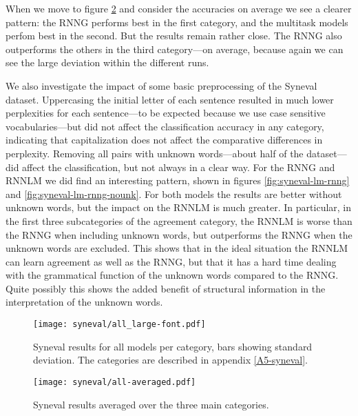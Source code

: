     When we move to figure \ref{fig:syneval-all-averaged} and consider the accuracies on average we see a clearer pattern: the RNNG performs best in the first category, and the multitask models perfom best in the second. But the results remain rather close. The RNNG also outperforms the others in the third category---on average, because again we can see the large deviation within the different runs.

    We also investigate the impact of some basic preprocessing of the Syneval dataset. Uppercasing the initial letter of each sentence resulted in much lower perplexities for each sentence---to be expected because we use case sensitive vocabularies---but did not affect the classification accuracy in any category, indicating that capitalization does not affect the comparative differences in perplexity. Removing all pairs with unknown words---about half of the dataset---did affect the classification, but not always in a clear way. For the RNNG and RNNLM we did find an interesting pattern, shown in figures \ref{fig:syneval-lm-rnng} and \ref{fig:syneval-lm-rnng-nounk}. For both models the results are better without unknown words, but the impact on the RNNLM is much greater. In particular, in the first three subcategories of the agreement category, the RNNLM is worse than the RNNG when including unknown words, but outperforms the RNNG when the unknown words are excluded. This shows that in the ideal situation the RNNLM can learn agreement as well as the RNNG, but that it has a hard time dealing with the grammatical function of the unknown words compared to the RNNG. Quite possibly this shows the added benefit of structural information in the interpretation of the unknown words.

      \begin{figure}[h]
        \center
        \texttt{[image: syneval/all\_large-font.pdf]}
      \caption{Syneval results for all models per category, bars showing standard deviation. The categories are described in appendix \ref{A5-syneval}.}
      \label{fig:syneval-all}
      \end{figure}
    \restoregeometry

    \begin{figure}[h]
      \center
      \texttt{[image: syneval/all-averaged.pdf]}
    \caption{Syneval results averaged over the three main categories.}
    \label{fig:syneval-all-averaged}
    \end{figure}

